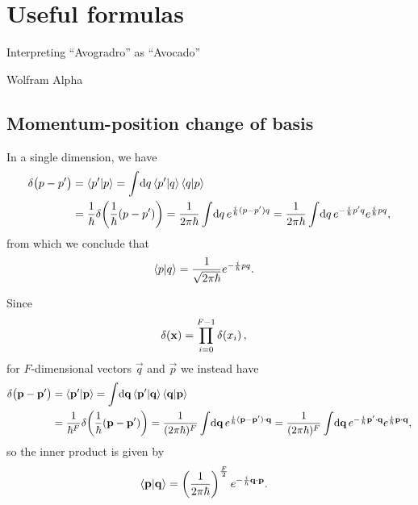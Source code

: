 \chapter{Useful formulas}

\epigraph{
Interpreting ``Avogradro'' as ``Avocado''
}{
Wolfram Alpha
}


\section{Momentum-position change of basis}

In a single dimension, we have~\cite[55-56]{sakurai1985modern}
\begin{subequations}
\begin{align}
	\ddf{p - p'}
	&= \braket{p' | p}
	= \int\! \dif q \braket{p' | q} \braket{q | p} \\
	&= \frac{1}{\hbar} \ddf{\frac{1}{\hbar} (p - p')}
	= \frac{1}{2 \pi \hbar} \int\! \dif q \, e^{\frac{i}{\hbar} (p - p') q}
	= \frac{1}{2 \pi \hbar} \int\! \dif q \, e^{-\frac{i}{\hbar} p' q} e^{\frac{i}{\hbar} p q},
\end{align}
\end{subequations}
from which we conclude that
\begin{align}
	\braket{p | q}
	&= \frac{1}{\sqrt{2 \pi \hbar}} e^{-\frac{i}{\hbar} p q}.
\end{align}

Since~\cite[59]{sakurai1985modern}
\begin{align}
	\delta\!\left( \bm{\mathbf{x}} \right)
	&= \prod_{i=0}^{F-1} \delta\!\left( x_i \right),
\end{align}
for $F$-dimensional vectors $\vec{q}$ and $\vec{p}$ we instead have
\begin{subequations}
\begin{align}
	\ddf{\vec{p} - \vec{p}'}
	&= \braket{\vec{p}' | \vec{p}}
	= \int\! \dif \vec{q} \braket{\vec{p}' | \vec{q}} \braket{\vec{q} | \vec{p}} \\
	&= \frac{1}{\hbar^F} \ddf{\frac{1}{\hbar} (\vec{p} - \vec{p}')}
	= \frac{1}{(2 \pi \hbar)^F} \int\! \dif \vec{q} \, e^{\frac{i}{\hbar} (\vec{p} - \vec{p}') \cdot \vec{q}}
	= \frac{1}{(2 \pi \hbar)^F} \int\! \dif \vec{q} \, e^{-\frac{i}{\hbar} \vec{p}' \cdot \vec{q}} e^{\frac{i}{\hbar} \vec{p} \cdot \vec{q}},
\end{align}
\end{subequations}
so the inner product is given by
\begin{align}
	\braket{\bm{\mathbf{p}} | \bm{\mathbf{q}}}
	&= \left( \frac{1}{2 \pi \hbar} \right)^\frac{F}{2} e^{-\frac{i}{\hbar} \bm{\mathbf{q}} \cdot \bm{\mathbf{p}}}.
		\label{eq:pq-inner}
\end{align}



